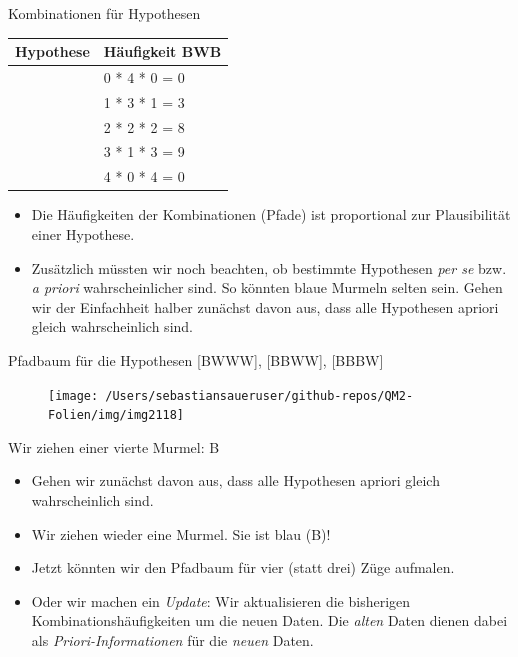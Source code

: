 \documentclass[
  ngerman,
  ignorenonframetext,
]{beamer}
\providecommand{\tightlist}{%
  \setlength{\itemsep}{0pt}\setlength{\parskip}{0pt}}
\begin{document}
\begin{frame}{Kombinationen für Hypothesen}
\protect\hypertarget{kombinationen-fuxfcr-hypothesen}{}
\begin{tabular}{l|l}
\hline
Hypothese & Häufigkeit BWB\\
\hline
[W W W W] & 0 * 4 * 0 = 0\\
\hline
[B W W W] & 1 * 3 * 1 = 3\\
\hline
[B B W W] & 2 * 2 * 2 = 8\\
\hline
[B B B W] & 3 * 1 * 3 = 9\\
\hline
[B B B B] & 4 * 0 * 4 = 0\\
\hline
\end{tabular}

\begin{itemize}
\item
  Die Häufigkeiten der Kombinationen (Pfade) ist proportional zur
  Plausibilität einer Hypothese.
\item
  Zusätzlich müssten wir noch beachten, ob bestimmte Hypothesen
  \emph{per se} bzw. \emph{a priori} wahrscheinlicher sind. So könnten
  blaue Murmeln selten sein. Gehen wir der Einfachheit halber zunächst
  davon aus, dass alle Hypothesen apriori gleich wahrscheinlich sind.
\end{itemize}
\end{frame}

\begin{frame}{Pfadbaum für die Hypothesen {[}BWWW{]}, {[}BBWW{]},
{[}BBBW{]}}
\protect\hypertarget{pfadbaum-fuxfcr-die-hypothesen-bwww-bbww-bbbw}{}
\begin{figure}[H]
\texttt{[image: /Users/sebastiansaueruser/github-repos/QM2-Folien/img/img2118]} \end{figure}
\end{frame}

\begin{frame}{Wir ziehen einer vierte Murmel: B}
\protect\hypertarget{wir-ziehen-einer-vierte-murmel-b}{}
\begin{itemize}
\tightlist
\item
  Gehen wir zunächst davon aus, dass alle Hypothesen apriori gleich
  wahrscheinlich sind.
\item
  Wir ziehen wieder eine Murmel. Sie ist blau (B)!
\item
  Jetzt könnten wir den Pfadbaum für vier (statt drei) Züge aufmalen.
\item
  Oder wir machen ein \emph{Update}: Wir aktualisieren die bisherigen
  Kombinationshäufigkeiten um die neuen Daten. Die \emph{alten} Daten
  dienen dabei als \emph{Priori-Informationen} für die \emph{neuen}
  Daten.
\end{itemize}
\end{frame}
\end{document}
